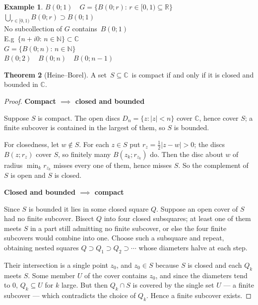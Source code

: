 \documentclass[11pt,a4paper]{article}
\theoremstyle{definition}
\newtheorem{thm}{Theorem}[section]
\newtheorem{example}[thm]{Example}
\newcommand{\subhead}[1]{%
  \par\medskip\noindent\textbf{#1}\par\nobreak\smallskip}
\begin{document}
\begin{example}

$B(0; 1) \quad  G = \big\{B(0; r): \, r \in [ 0,1) \subseteq \mathbb{R}\big\}$\\

$\bigcup\limits_{r\in [0,1)}B(0; r) \supset B(0; 1)$\\

No subcollection of $G$ contains $\, B(0; 1)$\\


E.g $\, \big\{ n + i0: \, n \in \mathbb{N}\big\} \subset \mathbb{C}$\\















$G = \big\{ B(0; n):\, n\in \mathbb{N}\big\}$\\

$B(0; 2)\quad  B(0; n)\quad  B(0; n- 1)$
\end{example}

\begin{thm}[Heine--Borel]
A set $\, S \subseteq \mathbb{C}\,$ is compact if and only if it is closed and bounded in $\mathbb{C}$.
\end{thm}

\begin{proof}
\subhead{Compact $\implies$ closed and bounded}
Suppose $S$ is compact. The open discs $D_n=\{z:\left|z\right|<n\}$ cover
$\mathbb{C}$, hence cover $S$; a finite subcover is contained in the largest of
them, so $S$ is bounded.

For closedness, let $w\notin S$. For each $z\in S$ put
$r_z=\frac{1}{2}\left|z-w\right|>0$; the discs $B(z;r_z)$ cover $S$, so
finitely many $B(z_k;r_{z_k})$ do. Then the disc about $w$ of radius
$\min_k r_{z_k}$ misses every one of them, hence misses $S$. So the complement
of $S$ is open and $S$ is closed.

\subhead{Closed and bounded $\implies$ compact}
Since $S$ is bounded it lies in some closed square $Q$. Suppose an open cover
of $S$ had no finite subcover. Bisect $Q$ into four closed subsquares; at least
one of them meets $S$ in a part still admitting no finite subcover, or else the
four finite subcovers would combine into one. Choose such a subsquare and
repeat, obtaining nested squares $Q\supset Q_1\supset Q_2\supset\cdots$ whose
diameters halve at each step.

Their intersection is a single point $z_0$, and $z_0\in S$ because $S$ is
closed and each $Q_k$ meets $S$. Some member $U$ of the cover contains $z_0$,
and since the diameters tend to $0$, $Q_k\subseteq U$ for $k$ large. But then
$Q_k\cap S$ is covered by the single set $U$ --- a finite subcover --- which
contradicts the choice of $Q_k$. Hence a finite subcover exists.
\end{proof}
\end{document}
